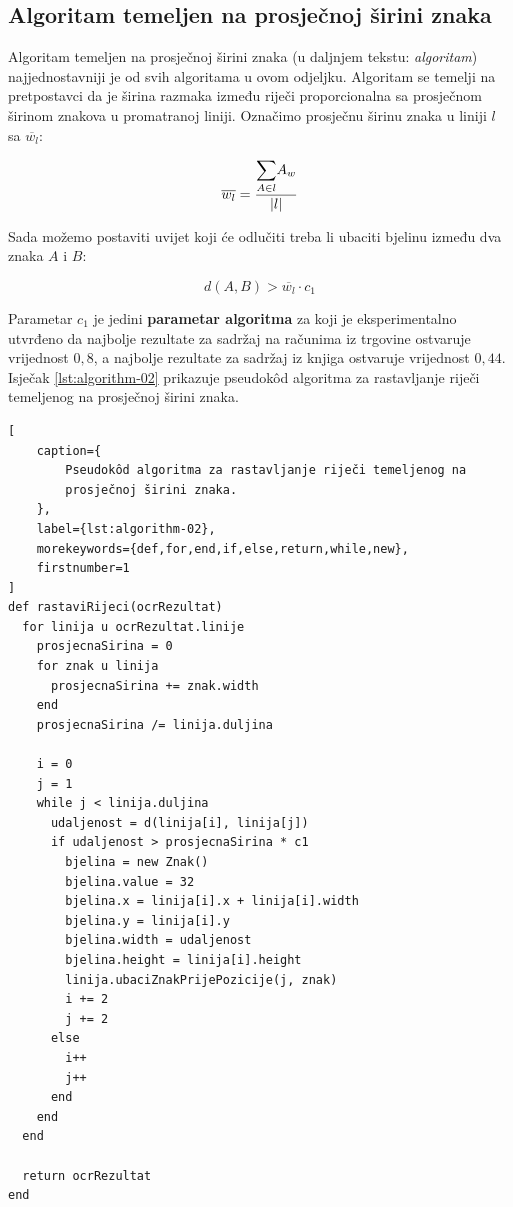 \documentclass[times, utf8, zavrsni]{fer}
\begin{document}
\subsection{Algoritam temeljen na prosječnoj širini znaka}
\label{subsec:algoritam-temeljen-na-prosjecnoj-sirini znaka}
Algoritam temeljen na prosječnoj širini znaka (u daljnjem tekstu:
\emph{algoritam}) najjednostavniji je od svih algoritama u ovom odjeljku.
Algoritam se temelji na pretpostavci da je širina razmaka između
riječi proporcionalna sa prosječnom širinom znakova u promatranoj liniji.
Označimo prosječnu širinu znaka u liniji $l$ sa $\overline{w_l}$:

\begin{equation}
\overline{w_l} = \frac{\mathlarger{\sum}\limits_{A \in l} A_w}{|l|}
\end{equation}

Sada možemo postaviti uvijet koji će odlučiti treba li ubaciti bjelinu između
dva znaka $A$ i $B$:

\begin{equation}
\label{eq:condition-01}
d(A, B) > \overline{w_l} \cdot c_1
\end{equation}

Parametar $c_1$ je jedini \textbf{parametar algoritma} za koji je
eksperimentalno utvrđeno da najbolje rezultate za sadržaj na računima iz
trgovine ostvaruje vrijednost $0{,}8$, a najbolje rezultate za sadržaj iz
knjiga ostvaruje vrijednost $0{,}44$. Isječak \ref{lst:algorithm-02} prikazuje
pseudokôd algoritma za rastavljanje riječi temeljenog na prosječnoj širini
znaka.

\begin{lstlisting}[
    caption={
        Pseudokôd algoritma za rastavljanje riječi temeljenog na
        prosječnoj širini znaka.
    },
    label={lst:algorithm-02},
    morekeywords={def,for,end,if,else,return,while,new},
    firstnumber=1
]
def rastaviRijeci(ocrRezultat)
  for linija u ocrRezultat.linije
    prosjecnaSirina = 0
    for znak u linija
      prosjecnaSirina += znak.width
    end
    prosjecnaSirina /= linija.duljina

    i = 0
    j = 1
    while j < linija.duljina
      udaljenost = d(linija[i], linija[j])
      if udaljenost > prosjecnaSirina * c1
        bjelina = new Znak()
        bjelina.value = 32
        bjelina.x = linija[i].x + linija[i].width
        bjelina.y = linija[i].y
        bjelina.width = udaljenost
        bjelina.height = linija[i].height
        linija.ubaciZnakPrijePozicije(j, znak)
        i += 2
        j += 2
      else
        i++
        j++
      end
    end
  end

  return ocrRezultat
end
\end{lstlisting}
\end{document}
